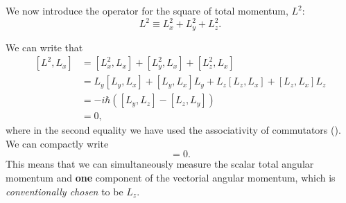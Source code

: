 We now introduce the operator for the square of total momentum, $L^2$:
\begin{equation}
L^2\equiv L_x^2+L_y^2+L_z^2.
\end{equation}
\begin{prt}
We can write that
\begin{equation}
\begin{aligned}
[L^2,L_x]&=[L^2_x,L_x]+[L^2_y,L_x]+[L^2_z,L_x]\\
&=L_y[L_y,L_x]+[L_y,L_x]L_y+L_z[L_z,L_x]+[L_z,L_x]L_z\\
&=-i\hbar([L_y,L_z]-[L_z,L_y])\\
&=0, 
\end{aligned}
\end{equation}
where in the second equality we have used the associativity of commutators (). We can compactly write 
\begin{equation}
[L^2,\bvec{L}]=0.
\end{equation}
This means that we can simultaneously measure the scalar total angular momentum 
and \textbf{one} component of the vectorial angular momentum, which is \textit{conventionally chosen} to be $L_z$.
\end{prt}
